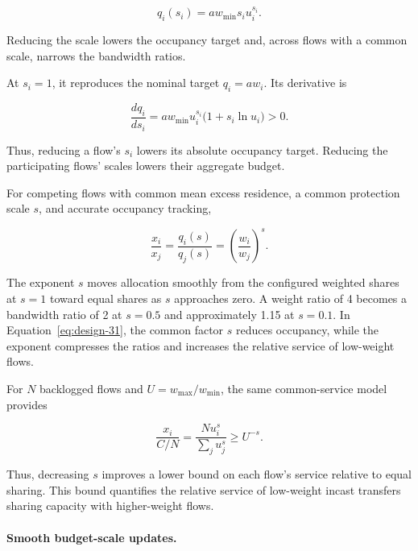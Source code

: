 \begin{equation}
\label{eq:design-31}
\boxed{
q_i(s_i)
=
aw_{\min}s_i u_i^{s_i}.
}
\end{equation}

Reducing the scale lowers the occupancy target and, across flows with a common scale, narrows the bandwidth ratios.

At \(s_i=1\), it reproduces the nominal target \(q_i=aw_i\). Its derivative is

\begin{equation}
\label{eq:design-32}
\frac{dq_i}{ds_i}
=
aw_{\min}u_i^{s_i}
\big(1+s_i\ln u_i\big)>0.
\end{equation}

Thus, reducing a flow's \(s_i\) lowers its absolute occupancy target. Reducing the participating flows' scales lowers their aggregate budget.

For competing flows with common mean excess residence, a common protection scale \(s\), and accurate occupancy tracking,

\begin{equation}
\label{eq:design-33}
\boxed{
\frac{x_i}{x_j}
=
\frac{q_i(s)}{q_j(s)}
=
\left(\frac{w_i}{w_j}\right)^s.
}
\end{equation}

The exponent \(s\) moves allocation smoothly from the configured weighted shares at \(s=1\) toward equal shares as \(s\) approaches zero. A weight ratio of 4 becomes a bandwidth ratio of 2 at \(s=0.5\) and approximately 1.15 at \(s=0.1\). In Equation~\eqref{eq:design-31}, the common factor \(s\) reduces occupancy, while the exponent compresses the ratios and increases the relative service of low-weight flows.

For \(N\) backlogged flows and \(U=w_{\max}/w_{\min}\), the same common-service model provides

\begin{equation}
\label{eq:design-34}
\frac{x_i}{C/N}
=
\frac{Nu_i^s}{\sum_ju_j^s}
\ge U^{-s}.
\end{equation}

Thus, decreasing \(s\) improves a lower bound on each flow's service relative to equal sharing. This bound quantifies the relative service of low-weight incast transfers sharing capacity with higher-weight flows.

\paragraph{Smooth budget-scale updates.}


